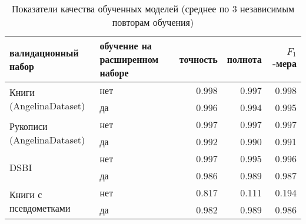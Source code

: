 \documentclass{main.tex}[subfiles]
\begin{document}
\begin{table}[H]
    \centering
    \caption{Показатели качества обученных моделей (среднее по 3 независимым повторам обучения)}
    \begin{tabular}{l p{} rrr}
        \hline
        валидационный набор & обучение на расширенном наборе & точность & полнота & $F_1$-мера \\
        \hline
        \multirow{2}{*}{ Книги (AngelinaDataset) }
         & нет & 0.998 & 0.997 & 0.998 \\
         & да  & 0.996 & 0.994 & 0.995 \\
        \multirow{2}{*}{ Рукописи (AngelinaDataset) }
         & нет & 0.997 & 0.997 & 0.997 \\
         & да  & 0.992 & 0.990 & 0.991 \\
        \multirow{2}{*}{ DSBI }
         & нет & 0.997 & 0.995 & 0.996 \\
         & да & 0.986 & 0.989 & 0.987 \\
        \multirow{2}{*}{ Книги с псевдометками }
         & нет & 0.817 & 0.111 & 0.194 \\
         & да & 0.982 & 0.989 & 0.986 \\
        \hline
    \end{tabular}
    \label{table:validate_results}
\end{table}
\end{document}
